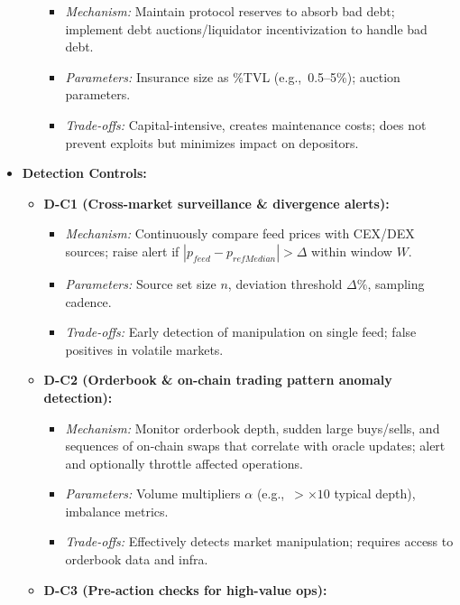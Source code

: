\begin{itemize}
\begin{itemize}
\begin{itemize}
                    \item \textit{Mechanism:} Maintain protocol reserves to absorb bad debt; implement debt auctions/liquidator incentivization to handle bad debt.
                    \item \textit{Parameters:} Insurance size as \%TVL (e.g.,\ 0.5--5\%); auction parameters.
                    \item \textit{Trade-offs:} Capital-intensive, creates maintenance costs; does not prevent exploits but minimizes impact on depositors.
                \end{itemize}
        \end{itemize}
    \item \textbf{Detection Controls:}
        \begin{itemize}
            \item \textbf{D-C1 (Cross-market surveillance \& divergence alerts):}
                \begin{itemize}
                    \item \textit{Mechanism:} Continuously compare feed prices with CEX/DEX sources; raise alert if $|p_{feed} - p_{refMedian}| > \Delta$ within window $W$.
                    \item \textit{Parameters:} Source set size $n$, deviation threshold $\Delta\%$, sampling cadence.
                    \item \textit{Trade-offs:} Early detection of manipulation on single feed; false positives in volatile markets.
                \end{itemize}
            \item \textbf{D-C2 (Orderbook \& on-chain trading pattern anomaly detection):}
                \begin{itemize}
                    \item \textit{Mechanism:} Monitor orderbook depth, sudden large buys/sells, and sequences of on-chain swaps that correlate with oracle updates; alert and optionally throttle affected operations.
                    \item \textit{Parameters:} Volume multipliers $\alpha$ (e.g.,\ $> \times 10$ typical depth), imbalance metrics.
                    \item \textit{Trade-offs:} Effectively detects market manipulation; requires access to orderbook data and infra.
                \end{itemize}
            \item \textbf{D-C3 (Pre-action checks for high-value ops):}

\end{itemize}
\end{itemize}

